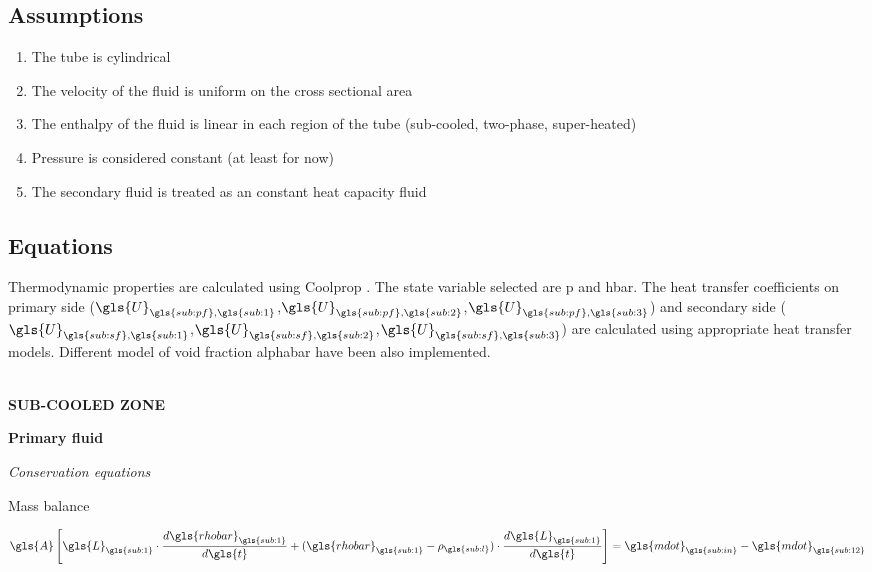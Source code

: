 \documentclass[11pt]{article} %
\begin{document}
\subsection{Assumptions}
\begin{enumerate}
\renewcommand{\theenumi}{\roman{enumi}}
\item The tube is cylindrical
\item The velocity of the fluid is uniform on the cross sectional area
\item The enthalpy of the fluid is linear in each region of the tube (sub-cooled, two-phase, super-heated)
\item Pressure is considered constant (at least for now)
\item The secondary fluid is treated as an constant heat capacity fluid
\end{enumerate}
\subsection{Equations}
Thermodynamic properties are calculated using Coolprop \cite{Bell2013}. The state variable selected are \gls{p} and \gls{hbar}. The heat transfer coefficients on primary side ($\gls{U}_{\gls{sub:pf},\gls{sub:1}}$,$\gls{U}_{\gls{sub:pf},\gls{sub:2}}$,$\gls{U}_{\gls{sub:pf},\gls{sub:3}}$) and secondary side ($\gls{U}_{\gls{sub:sf},\gls{sub:1}}$,$\gls{U}_{\gls{sub:sf},\gls{sub:2}}$,$\gls{U}_{\gls{sub:sf},\gls{sub:3}}$) are calculated using appropriate heat transfer models. Different model of void fraction \gls{alphabar} have been also implemented.\\
\\
\begin{center}
{\bf SUB-COOLED ZONE}
\end{center}
{\bf Primary fluid} 
\begin{center}
\textit{Conservation equations}\\
\end{center}


\begin{flushleft}
Mass balance\\
\end{flushleft}
\begin{equation}
\gls{A} \left[\gls{L}_{\gls{sub:1}}  \cdot \frac{d \gls{rhobar}_{\gls{sub:1}}}{d \gls{t}} + (\gls{rhobar}_{\gls{sub:1}} - \rho_{\gls{sub:l}}) \cdot \frac{d \gls{L}_{\gls{sub:1}}}{d \gls{t}}\right] = \gls{mdot}_{\gls{sub:in}} -  \gls{mdot}_{\gls{sub:12}}
\end{equation}
\end{document}
